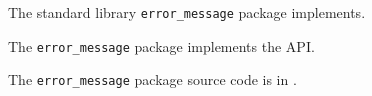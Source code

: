
The standard library {\tt error\_message} package implements.

The {\tt error\_message} package implements the  API.

The {\tt error\_message} package source code is in .



